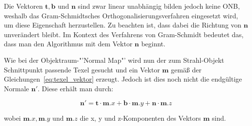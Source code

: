 Die Vektoren \( \boldsymbol{t}, \boldsymbol{b} \text{ und } \boldsymbol{n} \) sind zwar linear unabhängig bilden jedoch keine ONB, weshalb das Gram-Schmidtsches Orthogonalisierungsverfahren eingesetzt wird, um diese Eigenschaft herzustellen. Zu beachten ist, dass dabei die Richtung von \( \boldsymbol{n} \) unverändert bleibt. Im Kontext des Verfahrens von Gram-Schmidt bedeutet das, dass man den Algorithmus mit dem Vektor \( \boldsymbol{n} \) beginnt.

Wie bei der Objektraum-"'Normal Map"' wird nun der zum Strahl-Objekt Schnittpunkt passende Texel gesucht und ein Vektor \( \boldsymbol{m} \)
gemäß der Gleichungen~\ref{eq:texel_vektor} erzeugt. Jedoch ist dies noch nicht die endgültige Normale \( \boldsymbol{n'} \). Diese erhält man durch:

\begin{equation*}
    \boldsymbol{n'} = \boldsymbol{t} \cdot {\boldsymbol{m}.x } + \boldsymbol{b} \cdot {\boldsymbol{m}.y } + \boldsymbol{n} \cdot  {\boldsymbol{m}.z }
\end{equation*}

wobei \( {\boldsymbol{m}.x }, {\boldsymbol{m}.y } \text{ und }  {\boldsymbol{m}.z } \) die x, y und z-Komponenten des Vektors \( \boldsymbol{m} \) sind.






